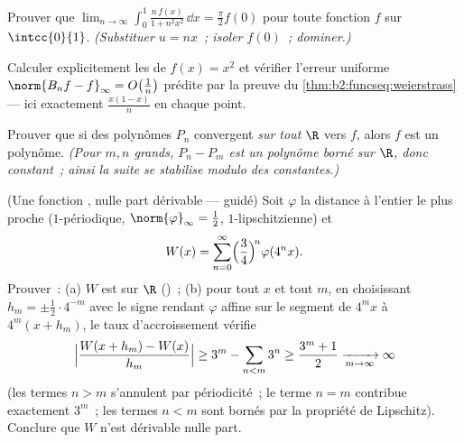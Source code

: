 \begin{exercise}[$\star\star$]\label{exo:b2:funcseq:6}
Prouver que $\displaystyle\lim_{n\to\infty} \int_0^1
\frac{n\,f(x)}{1 + n^2x^2}\,\dd x = \frac{\pi}{2} f(0)$ pour toute
fonction $f$  sur $\intcc{0}{1}$. \emph{(Substituer $u = nx$~;
isoler $f(0)$~; dominer.)}
\end{exercise}

\begin{exercise}[$\star\star$]\label{exo:b2:funcseq:7}
Calculer explicitement les  de $f(x) = x^2$ et
vérifier l'erreur uniforme $\norm{B_n f - f}_\infty =
O\bigl(\frac1n\bigr)$ prédite par la preuve du
\cref{thm:b2:funcseq:weierstrass} --- ici exactement $\frac{x(1 -
x)}{n}$ en chaque point.
\end{exercise}

\begin{exercise}[$\star\star$]\label{exo:b2:funcseq:8}
Prouver que si des polynômes $P_n$ convergent  \emph{sur
tout $\R$} vers $f$, alors $f$ est un polynôme. \emph{(Pour $m, n$
grands, $P_n - P_m$ est un polynôme borné sur $\R$, donc constant~;
ainsi la suite se stabilise modulo des constantes.)}
\end{exercise}

\begin{exercise}[$\star\star\star$]\label{exo:b2:funcseq:9}
(Une fonction , nulle part dérivable --- guidé) Soit
$\varphi$ la distance à l'entier le plus proche ($1$-périodique,
$\norm{\varphi}_\infty = \frac12$, $1$-lipschitzienne) et
\[
W(x) = \sum_{n=0}^{\infty} \Bigl(\frac{3}{4}\Bigr)^{\!n}
\varphi(4^n x) .
\]
Prouver~: (a) $W$ est  sur $\R$ ()~; (b)
pour tout $x$ et tout $m$, en choisissant $h_m = \pm\frac12\cdot 4^{-m}$
avec le signe rendant $\varphi$ affine sur le segment de $4^m x$
à $4^m(x + h_m)$, le taux d'accroissement vérifie
\[
\Bigl|\frac{W(x + h_m) - W(x)}{h_m}\Bigr| \geq 3^m -
\sum_{n<m} 3^n \geq \frac{3^m + 1}{2} \xrightarrow[m\to\infty]{}
\infty
\]
(les termes $n > m$ s'annulent par périodicité~; le terme $n = m$
contribue exactement $3^m$~; les termes $n < m$ sont bornés par la
propriété de Lipschitz). Conclure que $W$ n'est dérivable nulle part.
\end{exercise}

